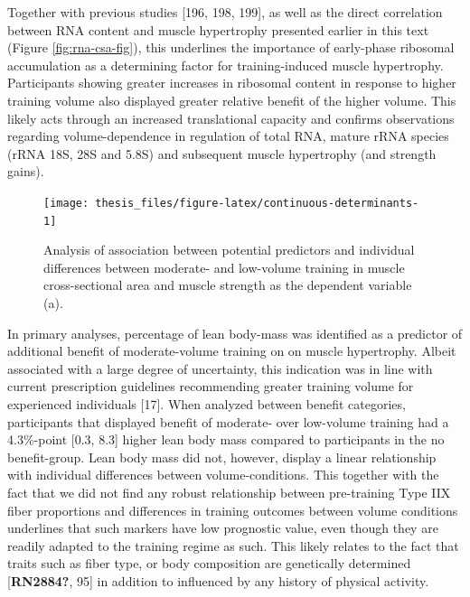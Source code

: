 \documentclass[twoside,10pt]{gihclass} %
\begin{document}
Together with previous studies
{[}196, 198, 199{]},
as well as the direct correlation between RNA content and muscle hypertrophy presented earlier in this text
(Figure \ref{fig:rna-csa-fig}),
this underlines the importance of early-phase ribosomal accumulation as a determining factor for training-induced muscle hypertrophy.
Participants showing greater increases in ribosomal content in response to higher training volume also displayed greater relative benefit of the higher volume.
This likely acts through an increased translational capacity and confirms observations regarding volume-dependence in regulation of total RNA, mature rRNA species (rRNA 18S, 28S and 5.8S) and subsequent muscle hypertrophy (and strength gains).
\begin{figure}

{\centering \texttt{[image: thesis\_files/figure-latex/continuous-determinants-1]} 

}

\caption[Predictors of differences in outcomes between moderate- and low-volume training. Values in (a) are standardized regression coefficients with 95\% CI from univariate robust regression. Positive estimates indicate a positive association. Variables related to blood parameters, body composition and muscle strength was mean centered per sex.]{Analysis of association between potential predictors and individual differences between moderate- and low-volume training in muscle cross-sectional area and muscle strength as the dependent variable (a).}\label{fig:continuous-determinants}
\end{figure}
In primary analyses, percentage of lean body-mass was identified as a predictor of additional benefit of moderate-volume training on on muscle hypertrophy.
Albeit associated with a large degree of uncertainty, this indication was in line with current prescription guidelines recommending greater training volume for experienced individuals
{[}17{]}.
When analyzed between benefit categories, participants that displayed benefit of moderate- over low-volume training had a 4.3\%-point {[}0.3, 8.3{]} higher lean body mass compared to participants in the no benefit-group.
Lean body mass did not, however, display a linear relationship with individual differences between volume-conditions.
This together with the fact that we did not find any robust relationship between pre-training Type IIX fiber proportions and differences in training outcomes between volume conditions underlines that such markers have low prognostic value, even though they are readily adapted to the training regime as such.
This likely relates to the fact that traits such as fiber type, or body composition are genetically determined
{[}\textbf{RN2884?}, 95{]}
in addition to influenced by any history of physical activity.
\end{document}
